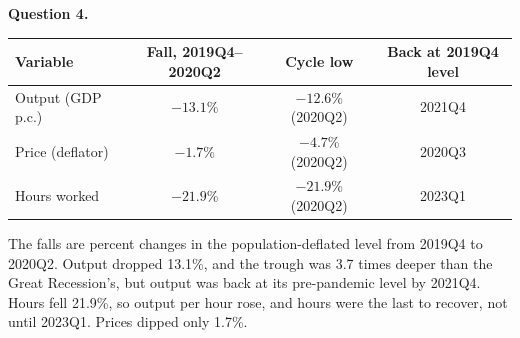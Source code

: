 \documentclass[11pt]{article}
\begin{document}
\bigskip
\textbf{Question 4.}

\begin{center}
\begin{tabular}{lccc}
\toprule
Variable & Fall, 2019Q4--2020Q2 & Cycle low & Back at 2019Q4 level \\
\midrule
Output (GDP p.c.) & $-13.1\%$ & $-12.6\%$ (2020Q2) & 2021Q4 \\
Price (deflator)  & $-1.7\%$  & $-4.7\%$ (2020Q2)  & 2020Q3 \\
Hours worked      & $-21.9\%$ & $-21.9\%$ (2020Q2) & 2023Q1 \\
\bottomrule
\end{tabular}
\end{center}

The falls are percent changes in the population-deflated level from 2019Q4 to 2020Q2. Output
dropped 13.1\%, and the trough was 3.7 times deeper than the Great Recession's, but output
was back at its pre-pandemic level by 2021Q4. Hours fell 21.9\%, so output per hour rose, and
hours were the last to recover, not until 2023Q1. Prices dipped only 1.7\%.
\end{document}
